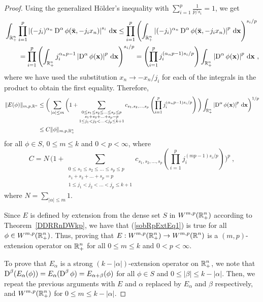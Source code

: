 \begin{proof}
Using the generalized Hölder's inequality with
$\displaystyle \sum_{i=1}^p \frac{1}{p/s_i} = 1$, we get
\begin{align*}
&\int_{\RR^n_+} \prod_{i=1}^p \left| (-j_i)^{\alpha_n} \diff^\alpha
\phi(\breve{\VEC{x}},-j_i x_n)\right|^{s_i} \dx{\VEC{x}}
\leq \prod_{i=1}^p \left( \int_{\RR^n_+} \left| (-j_i)^{\alpha_n} \diff^\alpha
\phi(\breve{\VEC{x}},-j_i x_n)\right|^p \dx{\VEC{x}} \right)^{s_i/p} \\
&\qquad = \prod_{i=1}^p \left( \int_{\RR^n_+} j_i^{\alpha_n p-1} \left|
 \diff^\alpha \phi(\VEC{x})\right|^p \dx{\VEC{x}} \right)^{s_i/p}
= \left( \prod_{i=1}^p j_i^{(\alpha_n p-1)s_i/p} \right) 
\int_{\RR^n_+} \left| \diff^\alpha \phi(\VEC{x})\right|^p \dx{\VEC{x}} \ ,
\end{align*}
where we have used the substitution $x_n \to -x_n/j_i$ for each of the
integrals in the product to obtain the first equality.  Therefore,
\begin{align}
\| E(\phi) \|_{m,p,\mathbb{R}^n}
&\leq \bigg( \sum_{|\alpha|\leq m} \bigg( 1
+ \sum_{\substack{0\leq s_1 \leq s_2 \leq \ldots \leq s_p \leq p\\
  s_1+s_2+\ldots+s_p = p\\
  1\leq j_1 < j_2 < \ldots <j_p \leq k+1}} c_{s_1,s_2,\ldots,s_p}
\left( \prod_{i=1}^p j_i^{(\alpha_n p-1)s_i/p} \right) \bigg) 
\int_{\mathbb{R}^n_+} \left| \operatorname{D}^\alpha \phi(\mathbf{x}) \right|^p \,\mathrm{d}{\mathbf{x}}
  \bigg)^{1/p} \nonumber \\
& \leq C \| \phi \|_{m,p,\mathbb{R}^n_+} \label{sobRpExtEq1}
\end{align}
for all $\phi \in S$, $0\leq m \leq k$ and $0<p<\infty$, where
\[
C = N\, \bigg(
1 + \sum_{\substack{0\leq s_1 \leq s_2 \leq \ldots \leq s_p \leq p\\
s_1+s_2+\ldots+s_p = p\\
1\leq j_1 < j_2 < \ldots <j_p \leq k+1}} c_{s_1,s_2,\ldots,s_p}
\left( \prod_{i=1}^p j_i^{(m p-1)s_i/p} \right) \bigg)^p \ ,
\]
where $\displaystyle N = \sum_{|\alpha|\leq m} 1$.

Since $E$ is defined by extension from the dense set $S$ in
$\displaystyle W^{m,p}(\mathbb{R}^n_+)$ according to Theorem~\ref{DDRRnDWkp},
we have that (\ref{sobRpExtEq1}) is true for all
$\displaystyle \phi \in W^{m,p}(\mathbb{R}^n_+)$.  Thus, proving that
$\displaystyle E: W^{m,p}(\mathbb{R}^n_+) \to W^{m,p}(\mathbb{R}^n)$ is a $(m,p)$-extension
operator on $\displaystyle \mathbb{R}^n_+$ for all
$0\leq m \leq k$ and $0<p<\infty$.

To prove that $E_\alpha$ is a strong $(k-|\alpha|)$-extension operator
on $\displaystyle \mathbb{R}^n_+$, we note that
$\displaystyle \operatorname{D}^{\beta} (E_\alpha(\phi))
= E_\alpha(\operatorname{D}^{\beta} \phi) = E_{\alpha+\beta}(\phi)$ for all
$\phi \in S$ and $0\leq |\beta| \leq k - |\alpha|$.  Then, we repeat
the previous arguments with $E$ and $\alpha$ replaced by $E_\alpha$
and $\beta$ respectively, and
$\displaystyle W^{m,p}(\mathbb{R}^n_+)$ for $0 \leq m \leq k-|\alpha|$.
\end{proof}

